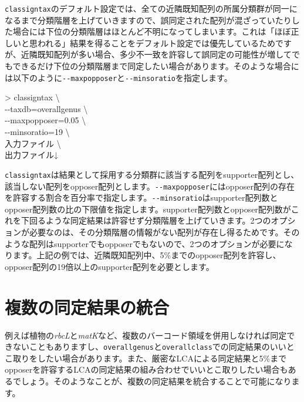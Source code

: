 \documentclass[titlepage,10pt,a4paper]{jsbook}
\newenvironment{cmd}{\begin{oframed}\raggedright\ttfamily\footnotesize\setlength{\baselineskip}{1.4em}}{\end{oframed}\vspace{-1em}}
\begin{document}
\texttt{classigntax}のデフォルト設定では、全ての近隣既知配列の所属分類群が同一になるまで分類階層を上げていきますので、誤同定された配列が混ざっていたりした場合には下位の分類階層はほとんど不明になってしまいます。これは「ほぼ正しいと思われる」結果を得ることをデフォルト設定では優先しているためですが、近隣既知配列が多い場合、多少不一致を許容して誤同定の可能性が増してでもできるだけ下位の分類階層まで同定したい場合があります。そのような場合には以下のように\texttt{{-}{-}maxpopposer}と\texttt{{-}{-}minsoratio}を指定します。
\begin{cmd}
{\textgreater} classigntax {\textbackslash}\\
{-}{-}taxdb=overall{\textunderscore}genus {\textbackslash}\\
{-}{-}maxpopposer=0.05 {\textbackslash}\\
{-}{-}minsoratio=19 {\textbackslash}\\
入力ファイル {\textbackslash}\\
出力ファイル↓
\end{cmd}
\texttt{classigntax}は結果として採用する分類群に該当する配列をsupporter配列とし、該当しない配列をopposer配列とします。\texttt{{-}{-}maxpopposer}にはopposer配列の存在を許容する割合を百分率で指定します。\texttt{{-}{-}minsoratio}はsupporter配列数とopposer配列数の比の下限値を指定します。supporter配列数とopposer配列数がこれを下回るような同定結果は許容せず分類階層を上げていきます。2つのオプションが必要なのは、その分類階層の情報がない配列が存在し得るためです。そのような配列はsupporterでもopposerでもないので、2つのオプションが必要になります。上記の例では、近隣既知配列中、5\%までのopposer配列を許容し、opposer配列の19倍以上のsupporter配列を必要とします。

\section{複数の同定結果の統合}
例えば植物の\textit{rbcL}と\textit{matK}など、複数のバーコード領域を併用しなければ同定できないこともありますし、\texttt{overall{\textunderscore}genus}と\texttt{overall{\textunderscore}class}での同定結果のいいとこ取りをしたい場合があります。また、厳密なLCAによる同定結果と5\%までopposerを許容するLCAの同定結果の組み合わせでいいとこ取りしたい場合もあるでしょう。そのようなことが、複数の同定結果を統合することで可能になります。
\end{document}
